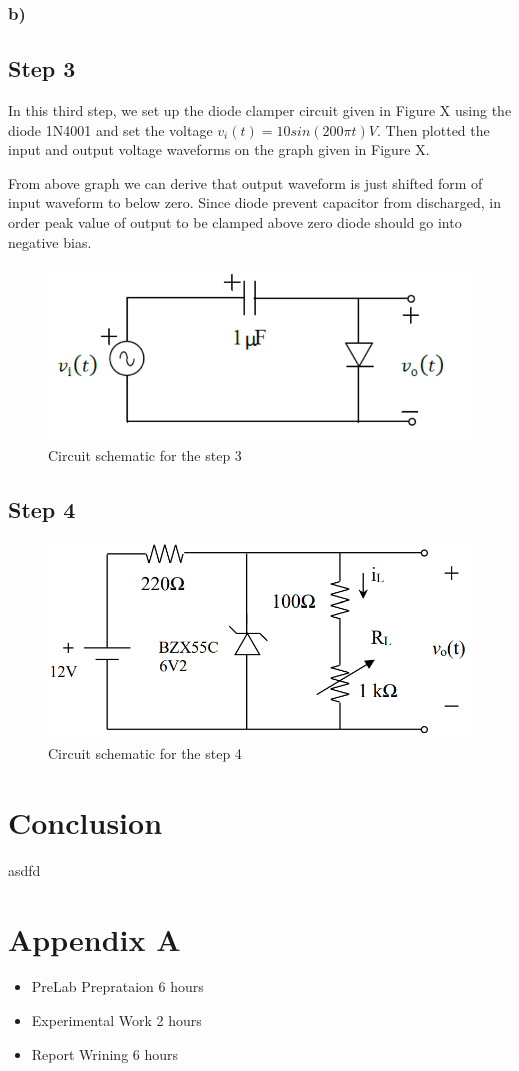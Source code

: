 \documentclass[letterpaper,12pt]{article}
\begin{document}
\subsubsection{b)}


\subsection{Step 3}

In this third step, we set up the diode clamper circuit given in Figure X using the diode 1N4001 and set the voltage \(v_i(t) = 10sin(200\pi t) V\). Then plotted the input and output voltage waveforms on the graph given in Figure X.

From above graph we can derive that output waveform is just shifted form of input waveform to below zero. Since diode prevent capacitor from discharged, in order peak value of output to be clamped above zero diode should go into negative bias.

\begin{figure}[H]
    \centering
    \includegraphics[width=1\textwidth]{3_1.png}
    \caption{Circuit schematic for the step 3}
\end{figure} 
    
    

\subsection{Step 4}

\begin{figure}[H]
    \centering
    \includegraphics[width=1\textwidth]{4_1.png}
    \caption{Circuit schematic for the step 4}
\end{figure} 
    
    
\section{Conclusion}
asdfd
\section*{Appendix A}
\begin{itemize}
    \item PreLab Preprataion 6 hours
    \item Experimental Work 2  hours
    \item Report Wrining 6 hours
\end{itemize}
\end{document}
